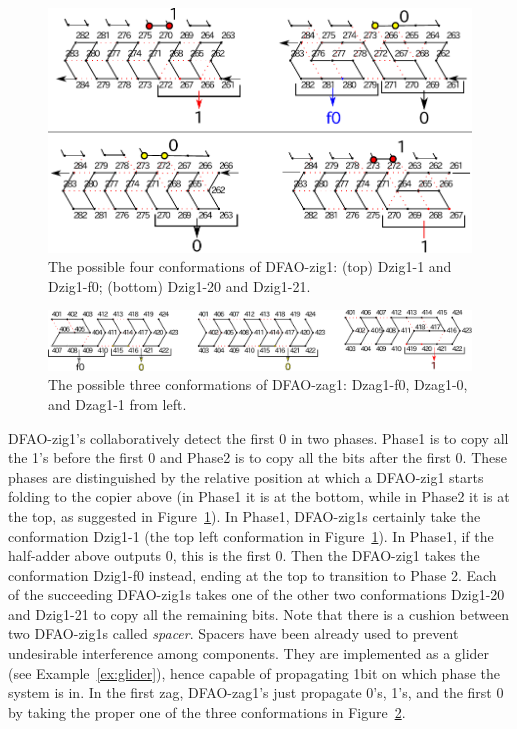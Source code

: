 \documentclass{article}
\theoremstyle{remark}
\begin{document}
\begin{figure}[h]
\centering
\includegraphics[width=0.7\linewidth]{Dzig1.pdf}
  \caption{The possible four conformations of DFAO-zig1: (top) Dzig1-1 and Dzig1-f0; (bottom) Dzig1-20 and Dzig1-21.}
  \label{fig:DFAO-zig1}
\end{figure} 

\begin{figure}[h]
\centering
\includegraphics[width=\linewidth]{Dzag1.pdf}
  \caption{The possible three conformations of DFAO-zag1: Dzag1-f0, Dzag1-0, and Dzag1-1 from left.}
  \label{fig:DFAO-zag1}
\end{figure} 

DFAO-zig1's collaboratively detect the first 0 in two phases.
Phase1 is to copy all the 1's before the first 0 and Phase2 is to copy all the bits after the first 0.
These phases are distinguished by the relative position at which a DFAO-zig1 starts folding to the copier above (in Phase1 it is at the bottom, while in Phase2 it is at the top, as suggested in Figure~\ref{fig:DFAO-zig1}).
In Phase1, DFAO-zig1s certainly take the conformation Dzig1-1 (the top left conformation in Figure~\ref{fig:DFAO-zig1}).
In Phase1, if the half-adder above outputs 0, this is the first 0. 
Then the DFAO-zig1 takes the conformation Dzig1-f0 instead, ending at the top to transition to Phase 2.
Each of the succeeding DFAO-zig1s takes one of the other two conformations Dzig1-20 and Dzig1-21 to copy all the remaining bits. 
Note that there is a cushion between two DFAO-zig1s called \textit{spacer}.
Spacers have been already used to prevent undesirable interference among components.
They are implemented as a glider (see Example~\ref{ex:glider}), hence capable of propagating 1bit on which phase the system is in.
In the first zag, DFAO-zag1's just propagate 0's, 1's, and the first 0 by taking the proper one of the three conformations in Figure~\ref{fig:DFAO-zag1}.
\end{document}
